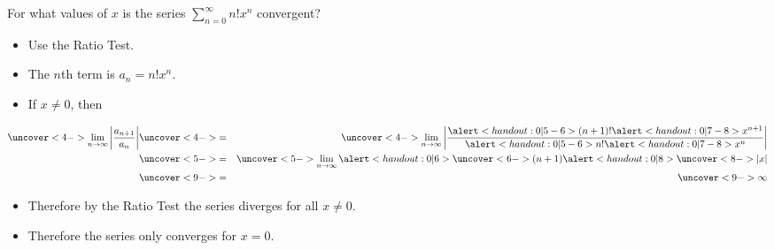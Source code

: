 \begin{frame}
\begin{example} %
For what values of $x$ is the series $\sum_{n=0}^\infty n! x^n$ convergent?
\begin{itemize}
\item<2->  Use the Ratio Test.
\item<3->  The $n$th term is $a_n = n! x^n$.
\item<4->  If $x\neq 0$, then
\end{itemize}
\abovedisplayskip=0pt
\belowdisplayskip=0pt
\begin{eqnarray*}
\uncover<4->{%
\lim_{n\to\infty} \left| \frac{a_{n+1}}{a_n}\right|%
}%
& \uncover<4->{ = } &%
\uncover<4->{%
\lim_{n\to\infty} \left| \frac{\alert<handout:0| 5-6>{(n+1)!}\alert<handout:0| 7-8>{x^{n+1}}}{\alert<handout:0| 5-6>{n!}\alert<handout:0| 7-8>{x^n}}\right|%
}\\%
& \uncover<5->{ = } &%
\uncover<5->{%
\lim_{n\to\infty} \alert<handout:0| 6>{\uncover<6->{(n+1)}}\alert<handout:0| 8>{\uncover<8->{|x|}}%
}\\%
& \uncover<9->{ = } &%
\uncover<9->{%
\infty%
}%
\end{eqnarray*}
\begin{itemize}
\item<10->  Therefore by the Ratio Test the series diverges for all $x\neq 0$.
\item<11->  Therefore the series only converges for $x = 0$.
\end{itemize}
\end{example}
\end{frame}
